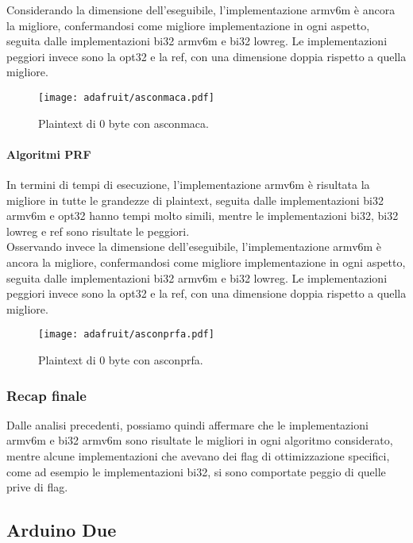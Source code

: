 \noindent Considerando la dimensione dell'eseguibile, l'implementazione armv6m è ancora la migliore, confermandosi come migliore implementazione in ogni aspetto, seguita dalle implementazioni bi32 armv6m e bi32 lowreg. Le implementazioni peggiori invece sono la opt32 e la ref, con una dimensione doppia rispetto a quella migliore.

\begin{figure}[H]
    \centering
    \texttt{[image: adafruit/asconmaca.pdf]}
    \caption{Plaintext di 0 byte con asconmaca.}
\end{figure}

\paragraph{Algoritmi PRF}

In termini di tempi di esecuzione, l'implementazione armv6m è risultata la migliore in tutte le grandezze di plaintext, seguita dalle implementazioni bi32 armv6m e opt32 hanno tempi molto simili, mentre le implementazioni bi32, bi32 lowreg e ref sono risultate le peggiori. \\

\noindent Osservando invece la dimensione dell'eseguibile, l'implementazione armv6m è ancora la migliore, confermandosi come migliore implementazione in ogni aspetto, seguita dalle implementazioni bi32 armv6m e bi32 lowreg. Le implementazioni peggiori invece sono la opt32 e la ref, con una dimensione doppia rispetto a quella migliore.

\begin{figure}[H]
    \centering
    \texttt{[image: adafruit/asconprfa.pdf]}
    \caption{Plaintext di 0 byte con asconprfa.}
\end{figure}

\subsubsection{Recap finale}

Dalle analisi precedenti, possiamo quindi affermare che le implementazioni armv6m e bi32 armv6m sono risultate le migliori in ogni algoritmo considerato, mentre alcune implementazioni che avevano dei flag di ottimizzazione specifici, come ad esempio le implementazioni bi32, si sono comportate peggio di quelle prive di flag.

\subsection{Arduino Due}


